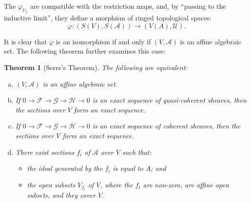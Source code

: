 \documentclass{article}
\theoremstyle{plain}
\newtheorem*{theorem}{Theorem}
\newcommand{\scr}[1]{{\mathscr{#1}}}
\newcommand{\oldpage}[1]{\marginpar{\footnotesize$\Big\vert$ \textit{p.~#1}}}
\begin{document}
The $\varphi_{U_f}$ are compatible with the restriction maps, and, by ``passing to the inductive limit'', they define a morphism of ringed topological spaces:
\oldpage{2-05}
\[
  \varphi\colon (S(V),S(\scr{A})) \to (V(A),\scr{U}).
\]

It is clear that $\varphi$ is an isomorphism if and only if $(V,\scr{A})$ is an affine algebraic set.
The following theorem further examines this case:

\begin{theorem}[Serre's Theorem]
  The following are equivalent:
  \begin{enumerate}[(a)]
    \item $(V,\scr{A})$ is an affine algebraic set.
    \item If $0\to\scr{F}\to\scr{G}\to\scr{H}\to0$ is an exact sequence of quasi-coherent sheaves, then the sections over $V$ form an exact sequence.
    \item If $0\to\scr{F}\to\scr{G}\to\scr{H}\to0$ is an exact sequence of coherent sheaves, then the sections over $V$ form an exact sequence.
    \item There exist sections $f_i$ of $\scr{A}$ over $V$ such that:
      \begin{itemize}
        \item the ideal generated by the $f_i$ is equal to $A$; and
        \item the open subsets $V_{f_i}$ of $V$, where the $f_i$ are non-zero, are affine open subsets, and they cover $V$.
      \end{itemize}
  \end{enumerate}
\end{theorem}
\end{document}

